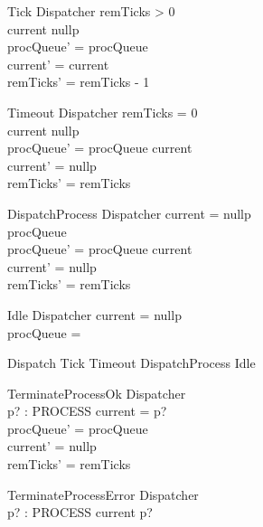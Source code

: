 \begin{schema}{Tick}
    \Delta Dispatcher
\where
    remTicks > 0 \\
    current \neq nullp \\
    procQueue' = procQueue \\
    current' = current \\
    remTicks' = remTicks - 1    
\end{schema}

\begin{schema}{Timeout}
    \Delta Dispatcher
\where
    remTicks = 0 \\
    current \neq nullp \\
    procQueue' = procQueue \cat \langle current \rangle \\
    current' = nullp \\
    remTicks' = remTicks 
\end{schema}

\begin{schema}{DispatchProcess}
    \Delta Dispatcher
\where
    current = nullp \\
    procQueue \neq \langle \rangle \\
    procQueue' = procQueue \cat \langle current \rangle \\
    current' = nullp \\
    remTicks' = remTicks 
\end{schema}

\begin{schema}{Idle}
    \Xi Dispatcher
\where
    current = nullp \\
    procQueue = \langle \rangle
\end{schema}

\begin{zed}
    Dispatch  Tick \lor Timeout \lor DispatchProcess \lor Idle
\end{zed}

\begin{schema}{TerminateProcessOk}
    \Delta Dispatcher \\
    p? : PROCESS
\where
    current = p? \\
    procQueue' = procQueue \\
    current' = nullp \\
    remTicks' = remTicks
\end{schema}

\begin{schema}{TerminateProcessError}
    \Xi Dispatcher \\
    p? : PROCESS
\where
    current \neq p?
\end{schema}

